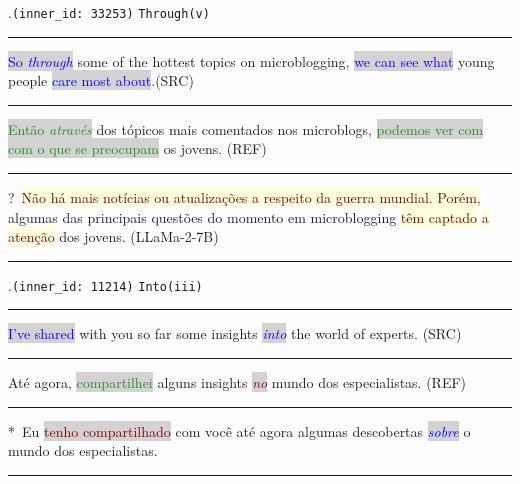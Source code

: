 \ex.\texttt{(inner\_id: 33253)} \hfill \texttt{Through(v)} \\[0.3ex]
\noindent\rule{\linewidth}{0.9pt}
\colorbox{lightgray}{\textcolor{blue}{So \emph{through}}} some of the hottest topics on microblogging, \colorbox{lightgray}{\textcolor{blue}{we can see what}} young people \colorbox{lightgray}{\textcolor{blue}{care most about}}.(SRC) \label{ex:ex-10} \\[-0.3ex]
\noindent\rule{\linewidth}{0.3pt}
\colorbox{lightgray}{\textcolor{ForestGreen}{Então \emph{através}}} dos tópicos mais comentados nos microblogs, \colorbox{lightgray}{\textcolor{ForestGreen}{podemos ver com}} \colorbox{lightgray}{\textcolor{ForestGreen}{com o que se preocupam}} os jovens. (REF) \\[-0.3ex]
\noindent\rule{\linewidth}{0.3pt}
?~\colorbox{lightyellow}{\textcolor{Maroon}{Não há mais notícias ou atualizações a respeito da guerra mundial. Porém,}} algumas das principais questões do momento em microblogging \colorbox{lightyellow}{\textcolor{Maroon}{têm captado}} \colorbox{lightyellow}{\textcolor{Maroon}{a atenção}} dos jovens.
(LLaMa-2-7B) \\[-0.3ex]
\noindent\rule{\linewidth}{0.9pt}


\ex.\texttt{(inner\_id: 11214)} \hfill \texttt{Into(iii)}\\[0.3ex]
\noindent\rule{\linewidth}{0.9pt}
\colorbox{lightgray}{\textcolor{blue}{I've shared}} with you so far some insights \colorbox{lightgray}{\textcolor{blue}{\emph{into}}} the world of experts. (SRC) \label{ex:ex-11} \\[-0.3ex]
\noindent\rule{\linewidth}{0.3pt}
Até agora, \colorbox{lightgray}{\textcolor{ForestGreen}{compartilhei}} alguns insights \colorbox{lightgray}{\textcolor{Maroon}{\emph{no}}} mundo dos especialistas. (REF) \\[-0.3ex]
\noindent\rule{\linewidth}{0.3pt}
*~Eu \colorbox{lightgray}{\textcolor{Maroon}{tenho compartilhado}} com você até agora algumas descobertas \colorbox{lightgray}{\textcolor{blue}{\emph{sobre}}} o mundo dos especialistas. \\[-0.3ex]
\noindent\rule{\linewidth}{0.9pt}

